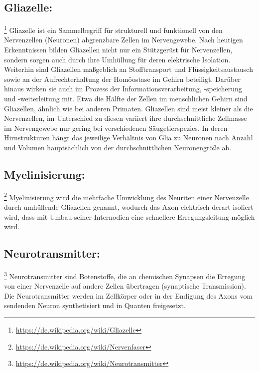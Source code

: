 \subsection{Gliazelle:}\footnote{\url{https://de.wikipedia.org/wiki/Gliazelle}} Gliazelle ist ein Sammelbegriff für strukturell und funktionell von den Nervenzellen (Neuronen) abgrenzbare Zellen im Nervengewebe. Nach heutigen Erkenntnissen bilden Gliazellen nicht nur ein Stützgerüst für Nervenzellen, sondern sorgen auch durch ihre Umhüllung für deren elektrische Isolation. Weiterhin sind Gliazellen maßgeblich an Stofftransport und Flüssigkeitsaustausch sowie an der Aufrechterhaltung der Homöostase im Gehirn beteiligt. Darüber hinaus wirken sie auch im Prozess der Informationsverarbeitung, -speicherung und -weiterleitung mit.
Etwa die Hälfte der Zellen im menschlichen Gehirn sind Gliazellen, ähnlich wie bei anderen Primaten. Gliazellen sind meist kleiner als die Nervenzellen, im Unterschied zu diesen variiert ihre durchschnittliche Zellmasse im Nervengewebe nur gering bei verschiedenen Säugetierspezies. In deren Hirnstrukturen hängt das jeweilige Verhältnis von Glia zu Neuronen nach Anzahl und Volumen hauptsächlich von der durchschnittlichen Neuronengröße ab.

\subsection{Myelinisierung:}\footnote{\url{https://de.wikipedia.org/wiki/Nervenfaser}} Myelinisierung wird die mehrfache Umwicklung des Neuriten einer Nervenzelle durch umhüllende Gliazellen genannt, wodurch das Axon elektrisch derart isoliert wird, dass mit Umbau seiner Internodien eine schnellere Erregungsleitung möglich wird.

\subsection{Neurotransmitter:}\footnote{\url{https://de.wikipedia.org/wiki/Neurotransmitter}} Neurotransmitter sind Botenstoffe, die an chemischen Synapsen die Erregung von einer Nervenzelle auf andere Zellen übertragen (synaptische Transmission). Die Neurotransmitter werden im Zellkörper oder in der Endigung des Axons vom sendenden Neuron synthetisiert und in Quanten freigesetzt.

